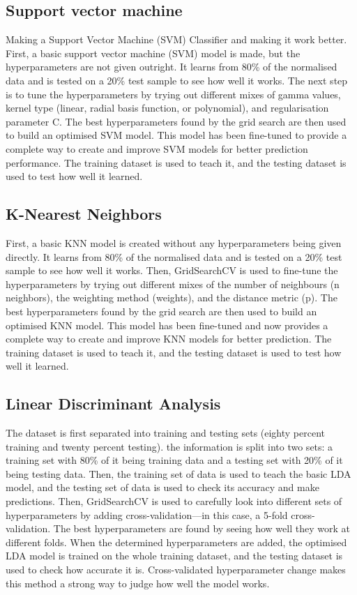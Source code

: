 \subsection{Support vector machine}
Making a Support Vector Machine (SVM) Classifier and making it work better. First, a basic support vector machine (SVM) model is made, but the hyperparameters are not given outright. It learns from 80\% of the normalised data and is tested on a 20\% test sample to see how well it works. The next step is to tune the hyperparameters by trying out different mixes of gamma values, kernel type (linear, radial basis function, or polynomial), and regularisation parameter C. The best hyperparameters found by the grid search are then used to build an optimised SVM model. This model has been fine-tuned to provide a complete way to create and improve SVM models for better prediction performance. The training dataset is used to teach it, and the testing dataset is used to test how well it learned.
\subsection{K-Nearest Neighbors}
First, a basic KNN model is created without any hyperparameters being given directly. It learns from 80\% of the normalised data and is tested on a 20\% test sample to see how well it works. Then, GridSearchCV is used to fine-tune the hyperparameters by trying out different mixes of the number of neighbours (n neighbors), the weighting method (weights), and the distance metric (p). The best hyperparameters found by the grid search are then used to build an optimised KNN model. This model has been fine-tuned and now provides a complete way to create and improve KNN models for better prediction. The training dataset is used to teach it, and the testing dataset is used to test how well it learned.


\subsection{Linear Discriminant Analysis}

The dataset is first separated into training and testing sets (eighty percent training and twenty percent testing). the information is split into two sets: a training set with 80\% of it being training data and a testing set with 20\% of it being testing data. Then, the training set of data is used to teach the basic LDA model, and the testing set of data is used to check its accuracy and make predictions. Then, GridSearchCV is used to carefully look into different sets of hyperparameters by adding cross-validation—in this case, a 5-fold cross-validation. The best hyperparameters are found by seeing how well they work at different folds. When the determined hyperparameters are added, the optimised LDA model is trained on the whole training dataset, and the testing dataset is used to check how accurate it is. Cross-validated hyperparameter change makes this method a strong way to judge how well the model works.





